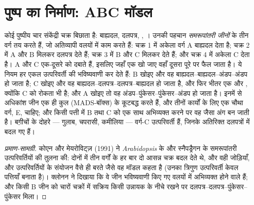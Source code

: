 \section{पुष्प का निर्माण: ABC मॉडल}

\begin{proposition}[ABC मॉडल]\label{prop:b2:plant-flowering:abc}
कोई पुष्पीय  चार संकेंद्री चक्र बिछाता है: बाह्यदल, दलपत्र,
, । उनकी पहचान \emph{समरूपांतरी जीनों} के तीन वर्ग तय करते
हैं, जो अतिव्यापी वलयों में काम करते हैं: चक्र 1 में अकेला वर्ग A
बाह्यदल देता है; चक्र 2 में A और B मिलकर दलपत्र देते हैं;
चक्र 3 में B और C मिलकर  देते हैं; और चक्र 4 में अकेला C
 देता है। A और C एक-दूसरे को दबाते हैं, इसलिए जहाँ एक खो जाए वहाँ
दूसरा पूरे  पर फैल जाता है। ये नियम हर एकल
उत्परिवर्ती की भविष्यवाणी कर देते हैं: B खोइए और वह 
बाह्यदल--बाह्यदल--अंडप--अंडप हो जाता है;
C खोइए और वह बाह्यदल--दलपत्र--दलपत्र--बाह्यदल हो जाता है, और फिर भीतर एक
और , क्योंकि C  को रोकता भी है; और A खोइए तो वह
अंडप--पुंकेसर--पुंकेसर--अंडप हो जाता है। इनमें से अधिकांश जीन एक ही कुल
(MADS-बॉक्स) के  कूटबद्ध करते हैं, और तीनों कार्यों के लिए
एक चौथा वर्ग, E, चाहिए; और किसी पत्ती में B तथा C को एक साथ अभिव्यक्त
करने पर वह  जैसा अंग बन जाती है। बग़ीचों के
दोहरे  --- गुलाब, चपरासी, कमीलिया --- वर्ग-C
उत्परिवर्ती हैं, जिनके  अतिरिक्त दलपत्रों में बदल गए हैं।
\end{proposition}
\begin{proof}[प्रमाण-सामग्री]
कोएन और मेयरोविट्ज़ (1991) ने \emph{Arabidopsis} के और स्नैपड्रैगन के
समरूपांतरी उत्परिवर्तियों की तुलना की: दोनों में तीन वर्गों के
 हर बार दो आसन्न चक्र बदल देते थे, और वही जोड़ियाँ,
और उत्परिवर्तियों के संयोजन वैसे ही बरते जैसे वह मॉडल कहता है (उनका
त्रिगुण उत्परिवर्ती केवल पत्तियाँ बनाता है)। क्लोनन ने दिखाया कि वे जीन
भविष्यवाणी किए गए वलयों में अभिव्यक्त होने वाले  हैं; और किसी
B जीन को चारों चक्रों में सक्रिय किसी उन्नायक के नीचे रखने पर
दलपत्र--दलपत्र--पुंकेसर--पुंकेसर मिला।
\end{proof}

